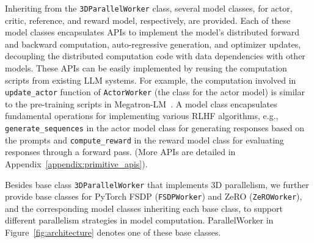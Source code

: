Inheriting from the \verb|3DParallelWorker| class, several model classes, for actor, critic, reference, and reward model, respectively, are provided.
Each of these model classes encapsulates APIs to implement the model's distributed forward and backward computation, auto-regressive generation, and optimizer updates, decoupling the distributed computation code with data dependencies with other models.
These APIs can be easily implemented by reusing the computation scripts from existing LLM systems. For example, the computation involved in \verb|update_actor| function of \verb|ActorWorker| (the class for the actor model) is similar to the pre-training scripts in Megatron-LM~\cite{shoeybi2019megatron}. 
A model class encapsulates %
fundamental operations %
for implementing various RLHF algorithms, 
e.g., \verb|generate_sequences| in the actor model class for generating responses based on the prompts 
and \verb|compute_reward| in the reward model class for evaluating responses through a forward pass.
({More APIs are detailed in 
Appendix~\ref{appendix:primitive_apis}}).

Besides base class \verb|3DParallelWorker| that implements 3D parallelism, we further provide base classes for PyTorch FSDP (\verb|FSDPWorker|) and ZeRO (\verb|ZeROWorker|), and the corresponding model classes inheriting each base class, to support different parallelism strategies in model computation. ParallelWorker in Figure~\ref{fig:architecture} denotes one of these base classes.




